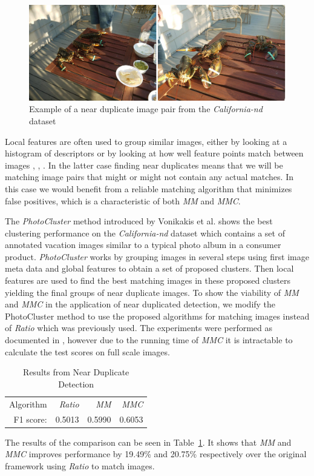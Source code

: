 \begin{figure}[h]
	\includegraphics[width=\textwidth]{images/near_duplicate_example}
	\caption{Example of a near duplicate image pair from the 
	\emph{California-nd} dataset \cite{jinda2012california}}
	\label{fig:near_duplicate}
\end{figure}

Local features are often used to group similar images, either by looking
at a histogram of descriptors \cite{wu2009bundling} or by looking at how
well feature points match between images \cite{zhao2009scale},
\cite{chu2010consumer}, \cite{vas2013cluster}. In the latter case 
finding near duplicates means that we will be matching image pairs that 
might or might not contain any actual matches. In this case we would 
benefit from a reliable matching algorithm that minimizes false 
positives, which is a characteristic of both \emph{MM} and \emph{MMC}.

The \emph{PhotoCluster} method introduced by Vonikakis et al.  
\cite{vas2013cluster} shows the best clustering performance on the 
\emph{California-nd} dataset \cite{jinda2012california} which contains a set of
annotated vacation images similar to a typical photo album in a consumer
product. \emph{PhotoCluster} works by grouping images in several steps 
using first image meta data and global features to obtain a set of 
proposed clusters. Then local features are used to find the best 
matching images in these proposed clusters yielding the final groups of 
near duplicate images. To show the viability of \emph{MM} and \emph{MMC} 
in the application of near duplicated detection, we modify the 
PhotoCluster method to use the proposed algorithms for matching images 
instead of \emph{Ratio} which was previously used. The experiments were 
performed as documented in \cite{vas2013cluster}, however due to the 
running time of \emph{MMC} it is intractable to calculate the test 
scores on full scale images. 

\begin{table}[htb]
\caption{Results from Near Duplicate Detection}
\label{table:ndd}
	\centering
\begin{tabular}{r*{3}{r}}
\hline
Algorithm & \emph{Ratio} & \emph{MM} & \emph{MMC}   \\
	\noalign{\smallskip}
    F1 score: & 0.5013 & 0.5990 & 0.6053 \\
    \hline
\end{tabular}
\end{table}

The results of the comparison can be seen in Table~\ref{table:ndd}. It 
shows that \emph{MM} and \emph{MMC} improves performance by 19.49\% and 
20.75\% respectively over the original framework using \emph{Ratio} to 
match images.
